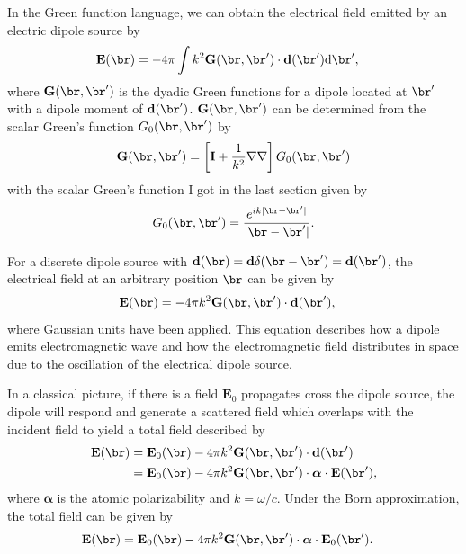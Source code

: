 \documentclass[]{report}
\begin{document}
In the Green function language, we can obtain the electrical field emitted by an electric dipole source by
\begin{align}\label{EGd}
\mathbf{E}(\br) &= -4\pi \int k^2\mathbf{G}(\br,\br')\cdot \mathbf{d}(\br') \mathrm{d}\br', 
\end{align}
where $ \mathbf{G}(\br,\br') $ is the dyadic Green functions for a dipole located at $ \br' $ with a dipole moment of $ \mathbf{d}(\br') $. $\mathbf{G}(\br,\br')$ can be determined from the scalar Green's function $G_0(\br,\br')$ by 
\begin{align}
\mathbf{G}(\br,\br') = \left[\mathbf{I} + \frac{1}{k^2}\nabla\nabla \right]G_0(\br,\br')
\end{align}
with the scalar Green's function I got in the last section given by
\begin{align}\label{scalarG}
G_0(\br,\br') = \frac{e^{ik|\br-\br'|}}{|\br-\br'|}. 
\end{align}

For a discrete dipole source with $ \mathbf{d}(\br)= \mathbf{d}\delta(\br-\br') = \mathbf{d}(\br')  $, the electrical field at an arbitrary position $\br$ can be given by
\begin{align}
 \mathbf{E}(\br) &=-4\pi k^2 \mathbf{G}(\br,\br')\cdot \mathbf{d}(\br'), 
\end{align}
where Gaussian units have been applied. This equation describes how a dipole emits electromagnetic wave and how the electromagnetic field distributes in space due to the oscillation of the electrical dipole source. 

In a classical picture, if there is a field $ \mathbf{E}_0 $ propagates cross the dipole source, the dipole will respond and generate a scattered field which overlaps with the incident field to yield a total field described by
\begin{align}
\mathbf{E}(\br) &= \mathbf{E}_0(\br)-4\pi k^2\mathbf{G}(\br,\br')\cdot \mathbf{d}(\br')\\
&=\mathbf{E}_0(\br)-4\pi k^2 \mathbf{G}(\br,\br')\cdot \boldsymbol{\alpha}\cdot \mathbf{E}(\br'),
\end{align}
where $ \boldsymbol{\alpha} $ is the atomic polarizability and $ k=\omega/c $. Under the Born approximation, the total field can be given by
\begin{align}
\mathbf{E}(\br) 
&=\mathbf{E}_0(\br)-4\pi k^2 \mathbf{G}(\br,\br')\cdot \boldsymbol{\alpha}\cdot \mathbf{E}_0(\br').\label{eq:EoutG}
\end{align}
\end{document}
